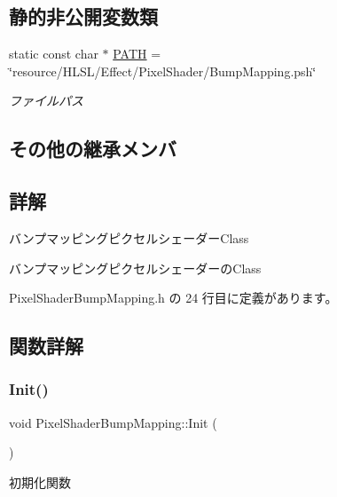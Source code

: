 \subsection*{静的非公開変数類}
\begin{DoxyCompactItemize}
\item 
static const char $\ast$ \mbox{\hyperlink{class_pixel_shader_bump_mapping_a62c06006cdfad9bc6158b5d779aa732c}{P\+A\+TH}} = \char`\"{}resource/H\+L\+SL/Effect/Pixel\+Shader/Bump\+Mapping.\+psh\char`\"{}
\begin{DoxyCompactList}\small\item\em ファイルパス \end{DoxyCompactList}\end{DoxyCompactItemize}
\subsection*{その他の継承メンバ}


\subsection{詳解}
バンプマッピングピクセルシェーダー\+Class 

バンプマッピングピクセルシェーダーの\+Class 

 Pixel\+Shader\+Bump\+Mapping.\+h の 24 行目に定義があります。



\subsection{関数詳解}
\mbox{\label{class_pixel_shader_bump_mapping_ab7807b7c56242e965ddb23e66e1a5d9e}} 
\subsubsection{\texorpdfstring{Init()}{Init()}}
{\footnotesize\ttfamily void Pixel\+Shader\+Bump\+Mapping\+::\+Init (\begin{DoxyParamCaption}{ }\end{DoxyParamCaption})\hspace{0.3cm}{\ttfamily [virtual]}}



初期化関数 


